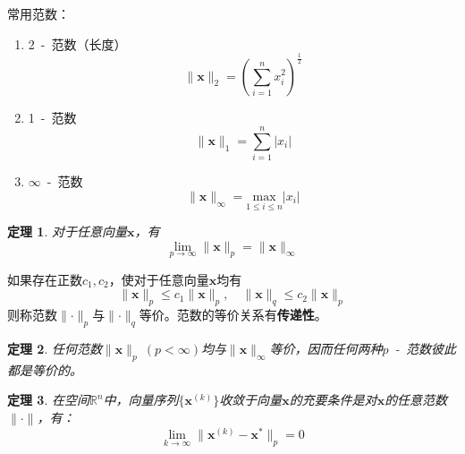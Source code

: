 \documentclass[fontset=ubuntu]{ctexart}
\newtheorem{theorem}{定理}
\numberwithin{equation}{section}
\numberwithin{theorem}{section}
\begin{document}
\begin{multicols}{2}
    常用范数：
    \begin{enumerate}[label=(\arabic*)]
        \item 2\ -\ 范数（长度）
            \begin{equation*}
                \lVert\mathbf{x}\rVert_2=\left(\sum_{i=1}^{n} x_i^2\right)^{\frac{1}{2}}
            \end{equation*}
        \item 1\ -\ 范数
            \begin{equation*}
                \lVert\mathbf{x}\rVert_1=\sum_{i=1}^{n}\lvert x_i\rvert
            \end{equation*}
        \item $\infty$\ -\ 范数
            \begin{equation*}
                \lVert\mathbf{x}\rVert_\infty=\underset{1\leq i\leq n}{\text{max}}\lvert x_i\rvert
            \end{equation*}
    \end{enumerate}

    \begin{theorem}
        对于任意向量$\mathbf{x}$，有
        \begin{equation}
            \lim_{p\to\infty}\lVert\mathbf{x}\rVert_p=\lVert\mathbf{x}\rVert_\infty
        \end{equation}
    \end{theorem}

    如果存在正数$c_1,c_2$，使对于任意向量$\mathbf{x}$均有
    \begin{equation*}
        \lVert\mathbf{x}\rVert_p\leq c_1\lVert\mathbf{x}\rVert_p,\quad \lVert\mathbf{x}\rVert_q\leq c_2\lVert\mathbf{x}\rVert_p
    \end{equation*}
    则称范数$\lVert\mathbf{\cdot}\rVert_p$与$\lVert\mathbf{\cdot}\rVert_q$等价。范数的等价关系有\textbf{传递性}。
    
    \begin{theorem}
        任何范数$\lVert\mathbf{x}\rVert_p\ (p<\infty)$均与$\lVert\mathbf{x}\rVert_\infty$等价，因而任何两种$p$\ -\ 范数彼此都是等价的。
    \end{theorem}

    \begin{theorem}
        在空间$\mathbb{R}^n$中，向量序列$\{\mathbf{x}^{(k)}\}$收敛于向量$\mathbf{x}$的充要条件是对$\mathbf{x}$的任意范数$\lVert\mathbf{\cdot}\rVert$，有：
        \begin{equation*}
            \lim_{k\to\infty}\lVert\mathbf{x}^{(k)}-\mathbf{x}^*\rVert_p=0
        \end{equation*}
    \end{theorem}


\end{multicols}
\end{document}
